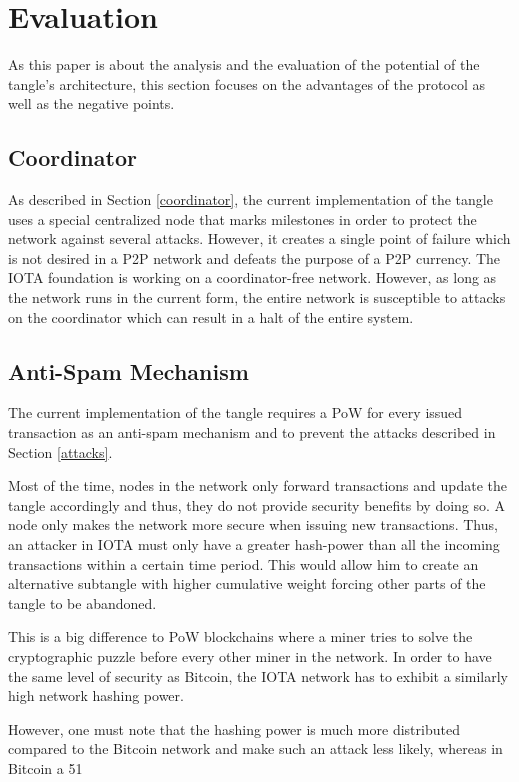 \chapter{Evaluation}

As this paper is about the analysis and the evaluation of the potential of the tangle's architecture, this section focuses on the advantages of the protocol as well as the negative points.

\section{Coordinator}
As described in Section \ref{coordinator}, the current implementation of the tangle uses a special centralized node that marks milestones in order to protect the network against several attacks. However, it creates a single point of failure which is not desired in a P2P network and defeats the purpose of a P2P currency. The IOTA foundation is working on a coordinator-free network. However, as long as the network runs in the current form, the entire network is susceptible to attacks on the coordinator which can result in a halt of the entire system.

\section{Anti-Spam Mechanism}
The current implementation of the tangle requires a PoW for every issued transaction as an anti-spam mechanism and to prevent the attacks described in Section \ref{attacks}. 

Most of the time, nodes in the network only forward transactions and update the tangle accordingly and thus, they do not provide security benefits by doing so. A node only makes the network more secure when issuing new transactions. Thus, an attacker in IOTA must only have a greater hash-power than all the incoming transactions within a certain time period. This would allow him to create an alternative subtangle with higher cumulative weight forcing other parts of the tangle to be abandoned. 

This is a big difference to PoW blockchains where a miner tries to solve the cryptographic puzzle before every other miner in the network. In order to have the same level of security as Bitcoin, the IOTA network has to exhibit a similarly high network hashing power.

However, one must note that the hashing power is much more distributed compared to the Bitcoin network and make such an attack less likely, whereas in Bitcoin a 51%

